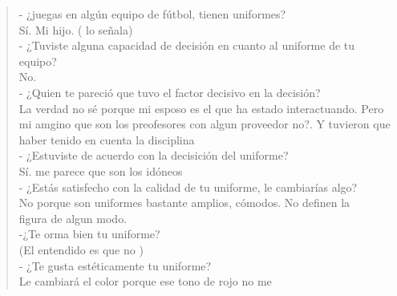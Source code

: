 \documentclass[11pt]{article}
\begin{document}
\begin{verse}
\vspace*{1em}
\vspace*{1em}
\vspace*{1em}
- ¿juegas en algún equipo de fútbol, tienen uniformes?\\
\hspace*{2em}Sí. Mi hijo. ( lo señala)\\
- ¿Tuviste alguna capacidad de decisión en cuanto al uniforme de tu equipo?\\
\hspace*{2em}No.\\
\vspace*{1em}
\vspace*{1em}
- ¿Quien te pareció que tuvo el factor decisivo en la decisión?\\
\vspace*{1em}
\hspace*{2em}La verdad no sé porque mi esposo es el que ha estado interactuando. Pero mi amgino que son los preofesores con algun proveedor no?. Y tuvieron que haber tenido en cuenta la disciplina\\
\vspace*{1em}
- ¿Estuviste de acuerdo con la decisición del uniforme?\\
\vspace*{1em}
\hspace*{2em}Sí. me parece que son los idóneos\\
\vspace*{1em}
- ¿Estás satisfecho con la calidad de tu uniforme, le cambiarías algo?\\
\vspace*{1em}
\hspace*{2em}No porque son uniformes bastante amplios, cómodos. No definen la\\
\hspace*{2em}figura de algun modo.\\
\vspace*{1em}
-¿Te orma bien tu uniforme?\\
\hspace*{2em}(El entendido es que no )\\
\vspace*{1em}
\vspace*{1em}
- ¿Te gusta estéticamente tu uniforme?\\
\vspace*{1em}
\hspace*{2em}Le cambiará el color porque ese tono de rojo no me\\

\end{verse}
\end{document}
